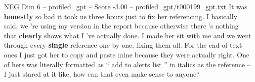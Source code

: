 \begin{textsample}{NEG Dim 6 – profiled\_gpt – Score -3.00 – profiled\_gpt/t000199\_gpt.txt}  \label{ex:f6_neg_003}
It was \textbf{honestly} so bad it took us three hours just to fix her referencing.
I basically said, we ’re using my version in the report because otherwise there ’s nothing that \textbf{clearly} shows what I ’ve actually done.
I made her sit with me and we went through every \textbf{single} reference one by one, fixing them all.
For the end-of-text ones I just got her to copy and paste mine because they were actually right.
One of hers was literally formatted as “ add to alerts list ” in italics as the reference – I just stared at it like, how can that even make sense to anyone?

\end{textsample}
